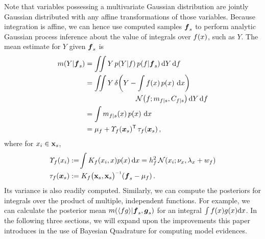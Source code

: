 \documentclass{article}
\begin{document}
Note that variables possessing a multivariate Gaussian distribution are jointly Gaussian distributed with any affine transformations of those variables. Because integration is affine, we can hence use computed samples $\vf_s$ to perform analytic Gaussian process inference about the value of integrals over $f(\lfv)$, such as $Y$. The mean estimate for $Y$ given $\vf_s$ is
%
\begin{align} \label{eq:mean_inty_f}
\mean{Y}{\vf_s}
& 
=\iint Y\,\p{Y}{f}\p{f}{\vf_s} \ud Y \,\ud f                                                                                                                                                               \nonumber\\
&
 =\iint Y\,\dd{Y}{\int f(\lfv)\,\po{\lfv}\,\ud\lfv}
\nonumber\\
&\hspace{2.5cm}
\N{f}{\meancondfn{f}{s}}{C_{f|s}} \ud Y \,\ud f \nonumber\\
&
 = \int \meancondfn{f}{s}(\lfv)\,\po{\lfv}\,\ud\lfv\nonumber\\
&
 = 
\mu_f + \ntT{s}{f}\, \dtt{s}{f}
\,,
\end{align}
where for $\lfv_i \in \vlfv_s$,
\begin{align}
\fnt{\lfv_i}{f} & \deq \!\int K_f(\lfv_i,\lfv)\po{\lfv}\ud\lfv
 = h_f^2\,\N{\lfv_i}{\nu_{\lfv}}{\lambda_{\lfv}+w_{f}}\nonumber\\
\dtt{s}{f} & \deq K_{f}\bigl(\vlfv_s,\vlfv_s\bigr)\inv (\vf_s-{\mu}_{f})\,.
\end{align}
%
%
Its variance is also readily computed. Similarly, we can compute the posteriors for integrals over the product of multiple, independent functions. For example, we can calculate the posterior mean 
$\mean{\inty{f g}}{\vf_s, \vect{g}_s}$ for an integral $\int f(x) g(x) \ud x$. 
 In the following three sections, we will expand upon the improvements this paper introduces in the use of Bayesian Quadrature for computing model evidences.
\end{document}
